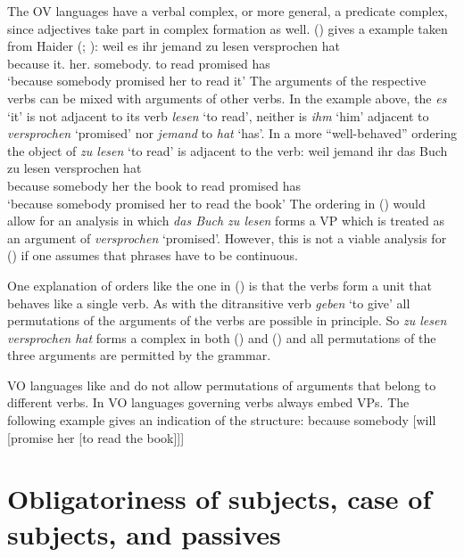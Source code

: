 The   OV languages have a verbal complex, or more general, a predicate complex, since adjectives take
part in complex formation as well. () gives a  example taken from Haider (\citeyear[]{Haider86c}; \citeyear[]{Haider90b}):
\ea
\gll weil es ihr jemand zu lesen versprochen hat\\
     because it.\ACC{} her.\DAT{} somebody.\NOM{} to read promised has\\\german
\glt `because somebody promised her to read it'
\z
The arguments of the respective verbs can be mixed with arguments of other verbs. In the example
above, the \emph{es} `it' is not adjacent to its verb \emph{lesen} `to read', neither is \emph{ihm}
`him' adjacent to \emph{versprochen} `promised' nor \emph{jemand} to \emph{hat} `has'. In a more
``well-behaved'' ordering the object of \emph{zu lesen} `to read' is adjacent to the verb:
\ea
\gll weil    jemand   ihr das Buch zu lesen versprochen hat\\
     because somebody her the book to read  promised    has\\
\glt `because somebody promised her to read the book'
\z
The ordering in () would allow for an analysis in which \emph{das Buch zu lesen} forms a VP
which is treated as an argument of \emph{versprochen} `promised'. However, this is not a viable
analysis for () if one assumes that phrases have to be continuous.

One explanation of orders like the one in () is that the verbs form a unit that behaves like a single verb. As with
the ditransitive verb \emph{geben} `to give' all permutations of the arguments of the verbs are
possible in principle. So \emph{zu lesen versprochen hat} forms a complex in both () and
() and all permutations of the three arguments are permitted by the grammar.

VO languages like  and  do not allow permutations of arguments that belong to different
verbs. In VO languages governing verbs always embed VPs. The following example gives an indication of the
structure:
\ea
because somebody [will [promise her [to read the book]]]
\z
{} 


\section{Obligatoriness of subjects, case of subjects, and passives}

